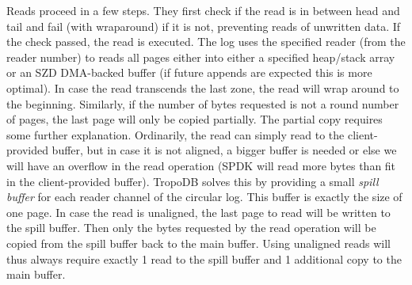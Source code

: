 Reads proceed in a few steps. They first check if the read is in between head and tail and fail (with wraparound) if it is not, preventing reads of unwritten data. If the check passed, the read is executed. The log uses the specified reader (from the reader number) to reads all pages either into either a specified heap/stack array or an SZD DMA-backed buffer (if future appends are expected this is more optimal). In case the read transcends the last zone, the read will wrap around to the beginning. Similarly, if the number of bytes requested is not a round number of pages, the last page will only be copied partially. The partial copy requires some further explanation. Ordinarily, the read can simply read to the client-provided buffer, but in case it is not aligned, a bigger buffer is needed or else we will have an overflow in the read operation (SPDK will read more bytes than fit in the client-provided buffer). TropoDB solves this by providing a small \textit{spill buffer} for each reader channel of the circular log. This buffer is exactly the size of one page. In case the read is unaligned, the last page to read will be written to the spill buffer. Then only the bytes requested by the read operation will be copied from the spill buffer back to the main buffer. Using unaligned reads will thus always require exactly 1 read to the spill buffer and 1 additional copy to the main buffer.

